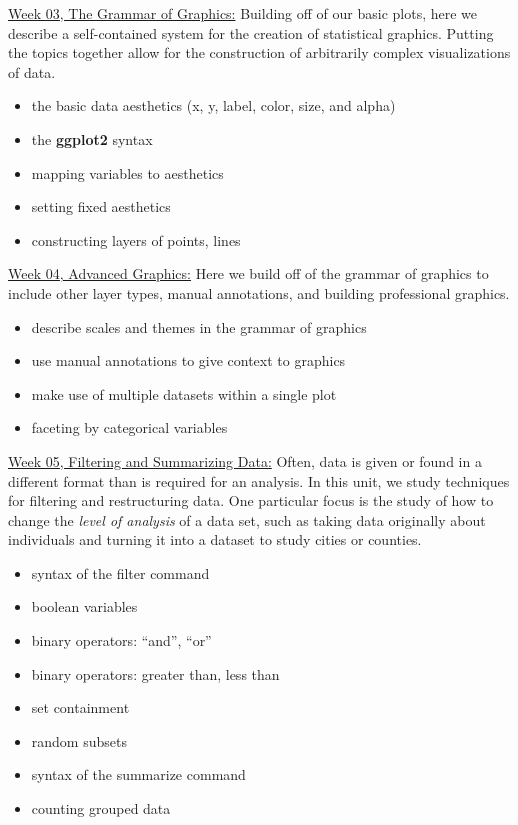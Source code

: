 \documentclass[12pt]{article}
\begin{document}
\bigskip

\underline{Week 03, The Grammar of Graphics:}
Building off of our basic plots, here we describe a self-contained
system for the creation of statistical graphics. Putting the topics
together allow for the construction of arbitrarily complex
visualizations of data.
\begin{itemize}\setlength\itemsep{0em}
\item
  the basic data aesthetics (x, y, label, color, size, and alpha)
\item
  the \textbf{ggplot2} syntax
\item
  mapping variables to aesthetics
\item
  setting fixed aesthetics
\item
  constructing layers of points, lines
\end{itemize}

\bigskip

\underline{Week 04, Advanced Graphics:}
Here we build off of the grammar of graphics to include
other layer types, manual annotations, and building
professional graphics.
\begin{itemize}\setlength\itemsep{0em}
\item describe scales and themes in the grammar of graphics
\item use manual annotations to give context to graphics
\item make use of multiple datasets within a single plot
\item
  faceting by categorical variables
\end{itemize}

\bigskip

\underline{Week 05, Filtering and Summarizing Data:}
Often, data is given or found in a different format than is required for
an analysis. In this unit, we study techniques for filtering and
restructuring data. One particular focus is the study of how to
change the \textit{level of analysis} of a data set, such as taking
data originally about individuals and turning it into a dataset to
study cities or counties.
\begin{itemize}\setlength\itemsep{0em}
\item
  syntax of the filter command
\item
  boolean variables
\item
  binary operators: ``and'', ``or''
\item
  binary operators: greater than, less than
\item
  set containment
\item
  random subsets
\item
  syntax of the summarize command
\item
  counting grouped data
\end{itemize}
\end{document}
